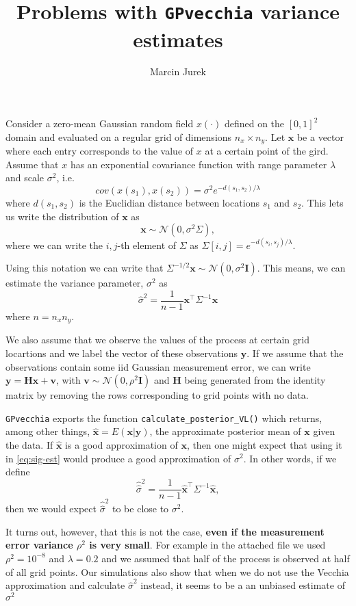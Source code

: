 \documentclass[11pt]{article} %
\title{Problems with \texttt{GPvecchia} variance estimates}
\author{Marcin Jurek}
\newcommand{\bx}{\mathbf{x}}
\newcommand{\by}{\mathbf{y}}
\newcommand{\bv}{\mathbf{v}}
\newcommand{\bI}{\mathbf{I}}
\newcommand{\bH}{\mathbf{H}}
\begin{document}
\maketitle

Consider a zero-mean Gaussian random field $x(\cdot)$ defined on the $[0,1]^2$ domain and evaluated on a regular grid of dimensions $n_x \times n_y$. Let $\bx$ be a vector where each entry corresponds to the value of $x$ at a certain point of the gird. Assume that $x$ has an exponential covariance function with range parameter $\lambda$ and scale $\sigma^2$, i.e. 
$$
cov\left(x(s_1), x(s_2)\right) = \sigma^2 e^{-d(s_1, s_2)/\lambda}
$$
where $d(s_1, s_2)$ is the Euclidian distance between locations $s_1$ and $s_2$. This lets us write the distribution of $\bx$ as 
$$
\bx \sim \mathcal{N}(0, \sigma^2\Sigma),
$$
where we can write the $i,j$-th element of $\Sigma$ as  $\Sigma[i,j] = e^{-d(s_i, s_j)/\lambda}$.

Using this notation we can write that $\Sigma^{-1/2}\bx \sim \mathcal{N}(0, \sigma^2 \bI)$. This means, we can estimate the variance parameter, $\sigma^2$ as
\begin{equation}
\hat{\sigma}^2 = \frac{1}{n-1}\bx^\top \Sigma^{-1} \bx 
\label{eq:sig-est}
\end{equation}
where $n = n_xn_y$. 

We also assume that we observe the values of the process at certain grid locartions and we label the vector of these observations $\by$. If we assume that the observations contain some iid Gaussian measurement error, we can write $\by = \bH\bx + \bv$, with $\bv \sim \mathcal{N}(0, \rho^2\bI)$ and $\bH$ being generated from the identity matrix by removing the rows corresponding to grid points with no data.

\texttt{GPvecchia} exports the function \texttt{calculate\_posterior\_VL()} which returns, among other things, $\hat{\bx} = E(\bx|\by)$, the approximate posterior mean of $\bx$ given the data. If $\hat{\bx}$ is a good approximation of $\bx$, then one might expect that using it in \ref{eq:sig-est} would produce a good approximation of $\sigma^2$. In other words, if we define
$$
\hat{\hat{\sigma}}^2 = \frac{1}{n-1}\hat{\bx}^\top \Sigma^{-1} \hat{\bx},
$$
then we would expect $\hat{\hat{\sigma}}^2$ to be close to $\sigma^2$. 

It turns out, however, that this is not the case, \textbf{even if the measurement error variance $\rho^2$ is very small}. For example in the attached file we used $\rho^2=10^{-8}$ and $\lambda=0.2$ and we assumed that half of the process is observed at half of all grid points. Our simulations also show that when we do not use the Vecchia approximation and calculate $\hat{\sigma}^2$ instead, it seems to be a an unbiased estimate of $\sigma^2$
\end{document}

